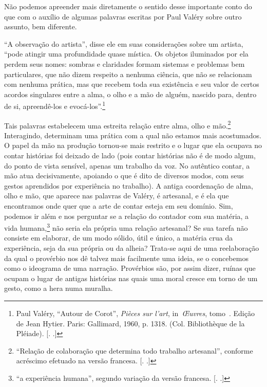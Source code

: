 Não podemos apreender mais diretamente o sentido desse importante conto
do que com o auxílio de algumas palavras escritas por Paul Valéry sobre
outro assunto, bem diferente.

``A observação do artista'', disse ele em suas considerações sobre um
artista, ``pode atingir uma profundidade quase mística. Os objetos
iluminados por ela perdem seus nomes: sombras e claridades formam
sistemas e problemas bem particulares, que não dizem respeito a nenhuma
ciência, que não se relacionam com nenhuma prática, mas que recebem toda
sua existência e seu valor de certos acordos singulares entre a alma, o
olho e a mão de alguém, nascido para, dentro de si, apreendê-los e
evocá-los''.\footnote{Paul Valéry, ``Autour de Corot'', \emph{Pièces sur
  l'art}, in~\emph{Œuvres}, tomo~. Edição de Jean Hytier. Paris:
  Gallimard, 1960, p. 1318. (Col. Bibliothèque de la Pléiade). [. .]}

Tais palavras estabelecem uma estreita relação entre alma, olho e
mão.\footnote{``Relação de colaboração que determina todo trabalho
  artesanal'', conforme acréscimo efetuado na versão francesa. [. 
  .]} Interagindo, determinam uma prática com a qual não estamos mais
acostumados. O papel da mão na produção tornou-se mais restrito e o
lugar que ela ocupava no contar histórias foi deixado de lado (pois
contar histórias não é de modo algum, do ponto de vista sensível, apenas
um trabalho da voz. No autêntico contar, a mão atua decisivamente,
apoiando o que é dito de diversos modos, com seus gestos aprendidos por
experiência no trabalho). A antiga coordenação de alma, olho e mão, que
aparece nas palavras de Valéry, é artesanal, e é ela que encontramos
onde quer que a arte de contar esteja em seu domínio. Sim, podemos ir
além e nos perguntar se a relação do contador com sua matéria, a vida
humana,\footnote{``a experiência humana'', segundo variação da versão
  francesa. [. .]} não seria ela própria uma relação
artesanal? Se sua tarefa não consiste em elaborar, de um modo sólido,
útil e único, a matéria crua da experiência, seja da sua própria ou da
alheia? Trata-se aqui de uma reelaboração da qual o provérbio nos dê
talvez mais facilmente uma ideia, se o concebemos como o ideograma de
uma narração. Provérbios são, por assim dizer, ruínas que ocupam o lugar
de antigas histórias nas quais uma moral cresce em torno de um gesto,
como a hera numa muralha.


